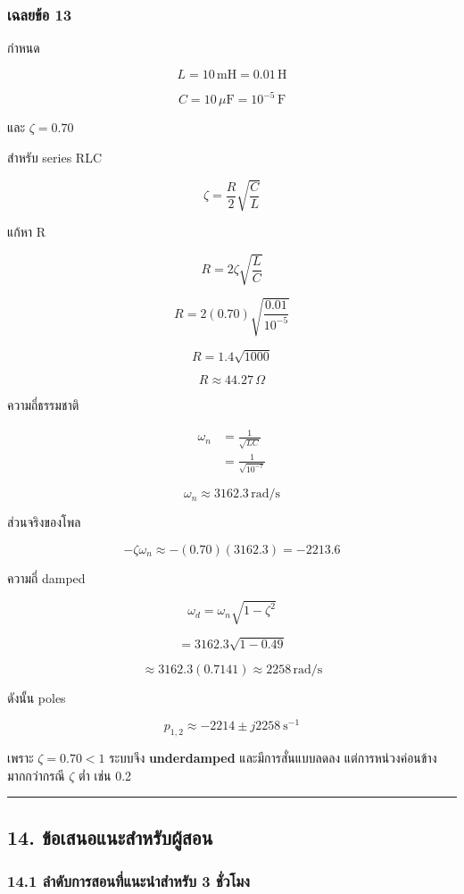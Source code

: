 \subsubsection{เฉลยข้อ 13}

กำหนด

\[
L=10\,\text{mH}=0.01\,\text{H}
\]

\[
C=10\,\mu\text{F}=10^{-5}\,\text{F}
\]

และ $\zeta=0.70$

สำหรับ series RLC

\[
\zeta=\frac{R}{2}\sqrt{\frac{C}{L}}
\]

แก้หา R

\[
R=2\zeta\sqrt{\frac{L}{C}}
\]

\[
R=2(0.70)\sqrt{\frac{0.01}{10^{-5}}}
\]

\[
R=1.4\sqrt{1000}
\]

\[
\boxed{R\approx44.27\,\Omega}
\]

ความถี่ธรรมชาติ

\[
\begin{aligned}
    \omega_n&=\frac{1}{\sqrt{LC}} \\
    &=\frac{1}{\sqrt{10^{-7}}}
\end{aligned}
\]

\[
\boxed{\omega_n\approx3162.3\,\text{rad/s}}
\]

ส่วนจริงของโพล

\[
-\zeta\omega_n\approx-(0.70)(3162.3)=-2213.6
\]

ความถี่ damped

\[
\omega_d=\omega_n\sqrt{1-\zeta^2}
\]

\[
=3162.3\sqrt{1-0.49}
\]

\[
\approx3162.3(0.7141)\approx2258\,\text{rad/s}
\]

ดังนั้น poles

\[
\boxed{p_{1,2}\approx-2214\pm j2258\ \text{s}^{-1}}
\]

เพราะ $\zeta=0.70<1$ ระบบจึง \textbf{underdamped} และมีการสั่นแบบลดลง แต่การหน่วงค่อนข้างมากกว่ากรณี $\zeta$ ต่ำ เช่น 0.2

\par\noindent\rule{\textwidth}{0.4pt}\par

\subsection{14. ข้อเสนอแนะสำหรับผู้สอน}

\subsubsection{14.1 ลำดับการสอนที่แนะนำสำหรับ 3 ชั่วโมง}

